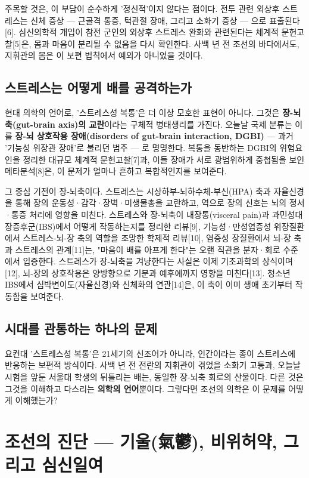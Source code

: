 \documentclass[11pt,oneside]{book}
\begin{document}
주목할 것은, 이 부담이 순수하게 '정신적'이지 않다는 점이다. 전투 관련 외상후 스트레스는 신체 증상 — 근골격 통증, 턱관절 장애, 그리고 소화기 증상 — 으로 표출된다[6]. 심신의학적 개입이 참전 군인의 외상후 스트레스 완화와 관련된다는 체계적 문헌고찰[5]은, 몸과 마음이 분리될 수 없음을 다시 확인한다. 사백 년 전 조선의 바다에서도, 지휘관의 몸은 이 보편 법칙에서 예외가 아니었을 것이다.

\subsection{스트레스는 어떻게 배를 공격하는가}
현대 의학의 언어로, '스트레스성 복통'은 더 이상 모호한 표현이 아니다. 그것은 \textbf{장-뇌축(gut-brain axis)의 교란}이라는 구체적 병태생리를 가진다. 오늘날 국제 분류는 이를 \textbf{장-뇌 상호작용 장애(disorders of gut-brain interaction, DGBI)} — 과거 '기능성 위장관 장애'로 불리던 범주 — 로 명명한다. 복통을 동반하는 DGBI의 위험요인을 정리한 대규모 체계적 문헌고찰[7]과, 이들 장애가 서로 광범위하게 중첩됨을 보인 메타분석[8]은, 이 문제가 얼마나 흔하고 복합적인지를 보여준다.

그 중심 기전이 장-뇌축이다. 스트레스는 시상하부-뇌하수체-부신(HPA) 축과 자율신경을 통해 장의 운동성·감각·장벽·미생물총을 교란하고, 역으로 장의 신호는 뇌의 정서·통증 처리에 영향을 미친다. 스트레스와 장-뇌축이 내장통(visceral pain)과 과민성대장증후군(IBS)에서 어떻게 작동하는지를 정리한 리뷰[9], 기능성·만성염증성 위장질환에서 스트레스-뇌-장 축의 역할을 조망한 학제적 리뷰[10], 염증성 장질환에서 뇌-장 축과 스트레스의 관계[11]는, "마음이 배를 아프게 한다"는 오랜 직관을 분자·회로 수준에서 입증한다. 스트레스가 장-뇌축을 겨냥한다는 사실은 이제 기초과학의 상식이며[12], 뇌-장의 상호작용은 양방향으로 기분과 예후에까지 영향을 미친다[13]. 청소년 IBS에서 심박변이도(자율신경)와 신체화의 연관[14]은, 이 축이 이미 생애 초기부터 작동함을 보여준다.

\subsection{시대를 관통하는 하나의 문제}
요컨대 '스트레스성 복통'은 21세기의 신조어가 아니라, 인간이라는 종이 스트레스에 반응하는 보편적 방식이다. 사백 년 전 전란의 지휘관이 겪었을 소화기 고통과, 오늘날 시험을 앞둔 서울대 학생의 뒤틀리는 배는, 동일한 장-뇌축 회로의 산물이다. 다른 것은 그것을 이해하고 다스리는 \textbf{의학의 언어}뿐이다. 그렇다면 조선의 의학은 이 문제를 어떻게 이해했는가?

\section{조선의 진단 — 기울(氣鬱), 비위허약, 그리고 심신일여}
\end{document}
